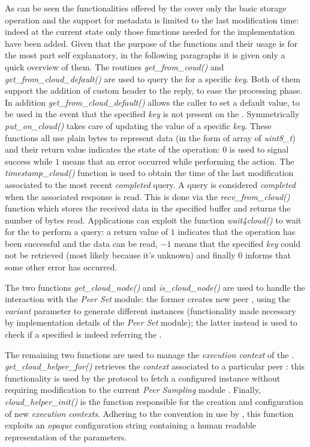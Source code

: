 As can be seen the functionalities offered by the \api cover only the
basic storage \cloud operation and the support for metadata is limited to the
last modification time: indeed at the current state only those
functions needed for the \cloudcast implementation have been
added.
Given that the purpose of the functions and their usage is for the most
part self explanatory, in the following paragraphs it is given
only a quick overview of them.
The routines \emph{get\_from\_coud()} and
\emph{get\_from\_cloud\_default()} are used to
query the \cloud for a specific \emph{key}. Both of them support the
addition of custom header to the reply, to ease the processing
phase. In addition \emph{get\_from\_cloud\_default()} allows the caller to
set a default value, to be used in the event that the specified
\emph{key} is not present on the \cloud. Symmetrically
\emph{put\_on\_cloud()} takes care of updating the value of a specific
\emph{key}. These functions all use plain bytes to represent
data (in the form of array of \emph{uint8\_t}) and their return
value indicates the state of the operation: $0$ is used to signal
success while $1$ means that an error occurred while performing the
action. The \emph{timestamp\_cloud()} function is used to obtain the time
of the last modification associated to the most recent
\emph{completed} query. A query is considered \emph{completed}
when the associated response is read. This is done via the
\emph{recv\_from\_cloud()} function which stores the received data in the
specified buffer and returns the number of bytes read. Applications can
exploit the function \emph{wait4cloud()} to wait for the \cloud to
perform a query: a return value of $1$ indicates that the
operation has been successful and the data can be read, $-1$ means that the
specified \emph{key} could not be retrieved (most likely because it's
unknown) and finally $0$ informs that some other error has occurred.

The two functions \emph{get\_cloud\_node()} and \emph{is\_cloud\_node()} are used
to handle the interaction with the \textit{Peer Set} module: the
former creates new peer \descriptors, using the \emph{variant}
parameter to generate different instances (functionality made
necessary by implementation details of the \textit{Peer Set} module);
the latter instead is used to check if a specified \descriptor is
indeed referring the \cloud.

The remaining two functions are used to manage the \textit{execution
  context} of the \cloudhelper. \textit{get\_cloud\_helper\_for()} retrieves the
\emph{context} associated to a particular peer \descriptor: this
functionality is used by the \cloudcast \peersampling protocol to
fetch a configured \cloudhelper instance without requiring
modification to the current \grapes \textit{Peer Sampling} module
\api. Finally, \textit{cloud\_helper\_init()} is the function
responsible for the
creation and configuration of new \cloudhelper \textit{execution
  contexts}. Adhering to the convention in use by \grapes, this function
exploits an \textit{opaque} configuration string containing a
human readable representation of the parameters.

